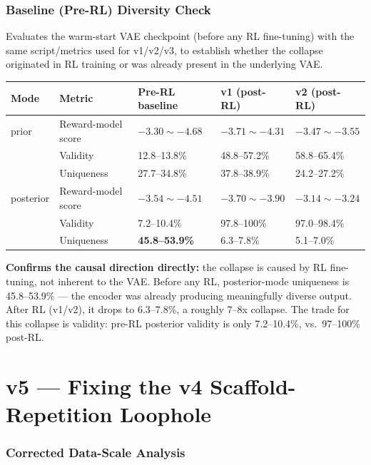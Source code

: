 \documentclass[11pt]{article}
\begin{document}
\section{Baseline (Pre-RL) Diversity Check}
\label{sec:baseline}

Evaluates the warm-start VAE checkpoint (before any RL fine-tuning) with the same script/metrics used for v1/v2/v3, to establish whether the collapse originated in RL training or was already present in the underlying VAE.

\begin{center}
\small
\begin{tabular}{@{}l l l l l@{}}
\toprule
\textbf{Mode} & \textbf{Metric} & \textbf{Pre-RL baseline} & \textbf{v1 (post-RL)} & \textbf{v2 (post-RL)} \\
\midrule
prior & Reward-model score & $-3.30\sim-4.68$ & $-3.71\sim-4.31$ & $-3.47\sim-3.55$ \\
 & Validity & 12.8--13.8\% & 48.8--57.2\% & 58.8--65.4\% \\
 & Uniqueness & 27.7--34.8\% & 37.8--38.9\% & 24.2--27.2\% \\
posterior & Reward-model score & $-3.54\sim-4.51$ & $-3.70\sim-3.90$ & $-3.14\sim-3.24$ \\
 & Validity & 7.2--10.4\% & 97.8--100\% & 97.0--98.4\% \\
 & Uniqueness & \textbf{45.8--53.9\%} & 6.3--7.8\% & 5.1--7.0\% \\
\bottomrule
\end{tabular}
\end{center}

\textbf{Confirms the causal direction directly:} the collapse is caused by RL fine-tuning, not inherent to the VAE. Before any RL, posterior-mode uniqueness is 45.8--53.9\% --- the encoder was already producing meaningfully diverse output. After RL (v1/v2), it drops to 6.3--7.8\%, a roughly 7--8x collapse. The trade for this collapse is validity: pre-RL posterior validity is only 7.2--10.4\%, vs.\ 97--100\% post-RL.

\part{v5 --- Fixing the v4 Scaffold-Repetition Loophole}

\section{Corrected Data-Scale Analysis}
\label{sec:datascale}
\end{document}
